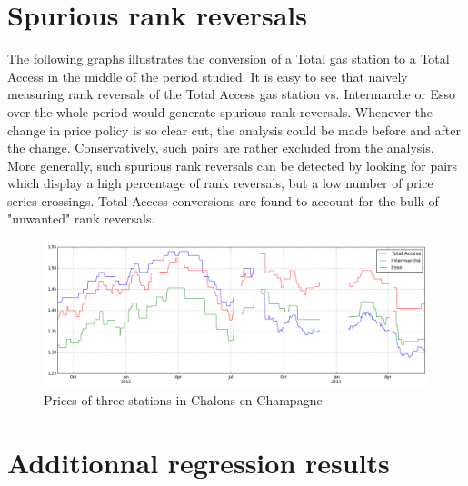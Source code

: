 \documentclass[11pt]{article}
\begin{document}
\newpage



\newpage

\appendix

\section{Spurious rank reversals}

The following graphs illustrates the conversion of a Total gas station to a Total Access in the middle of the period studied. It is easy to see that naively measuring rank reversals of the Total Access gas station vs. Intermarche or Esso over the whole period would generate spurious rank reversals. Whenever the change in price policy is so clear cut, the analysis could be made before and after the change. Conservatively, such pairs are rather excluded from the analysis. More generally, such spurious rank reversals can be detected by looking for pairs which display a high percentage of rank reversals, but a low number of price series crossings. Total Access conversions are found to account for the bulk of "unwanted" rank reversals.

\begin{figure}[H]
    \caption{Prices of three stations in Chalons-en-Champagne}
	\centering
		\includegraphics[width=16cm]{graphs/spurious_total_access_rr.png}
	\floatfoot{}
\end{figure}

\section{Additionnal regression results}
\end{document}

